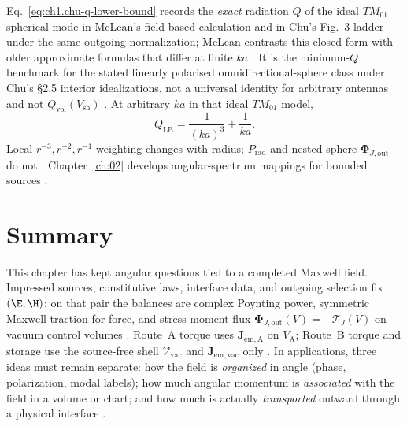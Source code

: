 Eq.~\eqref{eq:ch1.chu-q-lower-bound} records the \emph{exact} radiation $Q$ of the ideal $TM_{01}$ spherical mode in McLean's field-based calculation and in Chu's Fig.~3 ladder under the same outgoing normalization; McLean contrasts this closed form with older approximate formulas that differ at finite $ka$ \cite{mcclean1996,chu1948}. It is the minimum-$Q$ benchmark for the stated linearly polarised omnidirectional-sphere class under Chu's \S2.5 interior idealizations, not a universal identity for arbitrary antennas and not $Q_{\mathrm{vol}}(V_{\mathrm{sh}})$ \cite{chu1948,harrington2001,mcclean1996}. At arbitrary $ka$ in that ideal $TM_{01}$ model,
\begin{equation}
\label{eq:ch1.chu-q-lower-bound}
Q_{\mathrm{LB}}=\frac{1}{(ka)^3}+\frac{1}{ka}.
\end{equation}
Local $r^{-3},r^{-2},r^{-1}$ weighting changes with radius; $P_{\mathrm{rad}}$ and nested-sphere $\boldsymbol{\Phi}_{J,\mathrm{out}}$ do not \cite{poynting1884,stratton1941}. Chapter~\ref{ch:02} develops angular-spectrum mappings for bounded sources \cite{harrington2001}.

\section{Summary}
\label{sec:ch01.7}

This chapter has kept angular questions tied to a completed Maxwell field. Impressed sources, constitutive laws, interface data, and outgoing selection fix $(\E,\H)$; on that pair the balances are complex Poynting power, symmetric Maxwell traction for force, and stress-moment flux $\boldsymbol{\Phi}_{J,\mathrm{out}}(V)=-\boldsymbol{\mathcal{T}}_J(V)$ on vacuum control volumes \cite{maxwell1873,poynting1884,beth1936,stratton1941}. Route~A torque uses $\mathbf{J}_{\mathrm{em,A}}$ on $V_{\mathrm{A}}$; Route~B torque and storage use the source-free shell $\mathcal{V}_{\mathrm{vac}}$ and $\mathbf{J}_{\mathrm{em,vac}}$ only \cite{harrington2001}. In applications, three ideas must remain separate: how the field is \emph{organized} in angle (phase, polarization, modal labels); how much angular momentum is \emph{associated} with the field in a volume or chart; and how much is actually \emph{transported} outward through a physical interface \cite{allen1992,stratton1941}.


